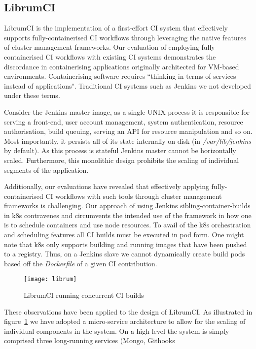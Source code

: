 \documentclass[journal]{IEEEtran}
\begin{document}
\subsection{LibrumCI}
LibrumCI is the implementation of a first-effort CI system that
effectively supports fully-containerised CI workflows
through leveraging the native features of cluster 
management frameworks. Our evaluation of employing
fully-containerised CI workflows with existing CI systems
demonstrates the discordance in containerising applications originally architected for 
VM-based environments. Containerising software
requires ``thinking in terms of services instead
of applications". Traditional CI systems such as Jenkins
we not developed under these terms.
\par 
Consider the Jenkins master image, as a single UNIX process
it is responsible for serving a front-end, user account management,
system authentication, resource authorisation, build queuing, 
serving an API for resource manipulation
and so on. Most importantly, it persists all of its state internally on disk (in \textit{/var/lib/jenkins} by default).
As this process is stateful Jenkins master cannot be horizontally scaled. Furthermore,
this monolithic design prohibits the scaling of individual segments of the application. 
\par
Additionally, our evaluations have revealed that effectively
applying fully-containerised CI workflows with such tools through 
cluster management frameworks is challenging. Our approach
of using Jenkins sibling-container-builds in k8s contravenes 
and circumvents the intended use of the framework in how one is to 
schedule containers and use node resources. To avail of 
the k8s orchestration and scheduling features all
CI builds must be executed in pod form. One might note that
k8s only supports building and running images that have been pushed
to a registry. Thus, on a Jenkins slave we cannot dynamically create 
build pods based off the \textit{Dockerfile} of a given CI contribution.
\begin{figure}[htp]
      \centering
      \texttt{[image: librum]}
      \caption{LibrumCI running concurrent CI builds} 
      \label{fig:librum}
\end{figure}
\par
These observations have been applied to the design of LibrumCI. As illustrated in figure~\ref{fig:librum}
we have adopted a micro-service architecture to allow for the 
scaling of individual components in the system. On a high-level
the system is simply comprised three long-running services (Mongo, Githooks
\end{document}
